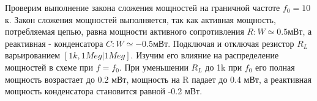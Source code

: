 \documentclass[a4paper, 12pt, twoside]{article}
\begin{document}
Проверим выполнение закона сложения мощностей на граничной частоте $f_0 = 10$к. Закон сложения мощностей выполняется, так как активная мощность, потребляемая цепью, равна мощности активного сопротивления $R: W \simeq 0.5$мВт, а реактивная - конденсатора $C:W\simeq -0.5$мВт. Подключая и отключая резистор $R_L$ варьированием $[1k,1Meg|1Meg]$. Изучим его влияние на распределение  мощностей в схеме при $f=f_0$. При уменьшении $R_L$ до 1k при $f_0$ его полная мощность возрастает до 0.2 мВт, мощность на R падает до 0.4 мВт, а реактивная мощность конденсатора становится равной -0.2 мВт.
\begin{figure}[H]
	\centering
	\begin{minipage}[h]{0.47\linewidth}
	\end{minipage}
~
	\begin{minipage}[h]{0.47\linewidth}
	\end{minipage}
\end{figure}
\newpage
\end{document}
